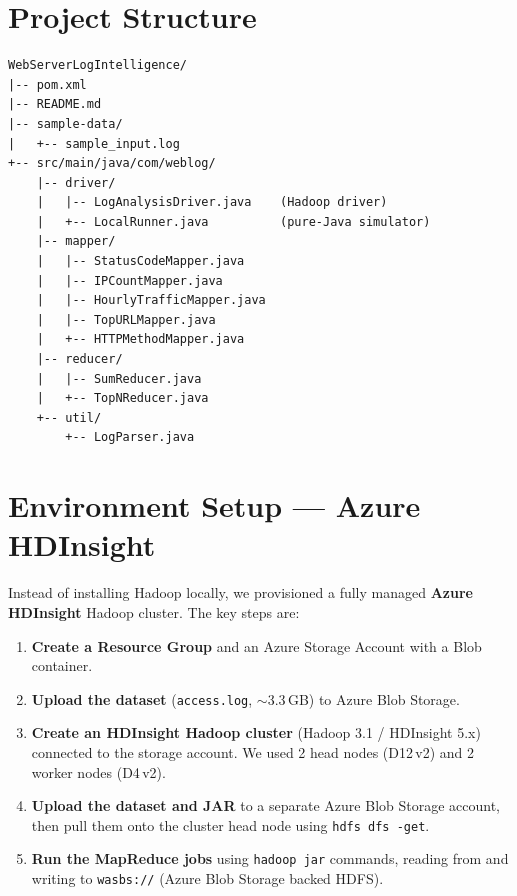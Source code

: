 \documentclass[12pt,a4paper]{article}
\begin{document}
\newpage

\section{Project Structure}

\begin{lstlisting}[language={},caption={Directory layout}]
WebServerLogIntelligence/
|-- pom.xml
|-- README.md
|-- sample-data/
|   +-- sample_input.log
+-- src/main/java/com/weblog/
    |-- driver/
    |   |-- LogAnalysisDriver.java    (Hadoop driver)
    |   +-- LocalRunner.java          (pure-Java simulator)
    |-- mapper/
    |   |-- StatusCodeMapper.java
    |   |-- IPCountMapper.java
    |   |-- HourlyTrafficMapper.java
    |   |-- TopURLMapper.java
    |   +-- HTTPMethodMapper.java
    |-- reducer/
    |   |-- SumReducer.java
    |   +-- TopNReducer.java
    +-- util/
        +-- LogParser.java
\end{lstlisting}

\section{Environment Setup --- Azure HDInsight}

Instead of installing Hadoop locally, we provisioned a fully managed \textbf{Azure HDInsight} Hadoop cluster. The key steps are:

\begin{enumerate}
    \item \textbf{Create a Resource Group} and an Azure Storage Account with a Blob container.
    \item \textbf{Upload the dataset} (\texttt{access.log}, $\sim$3.3\,GB) to Azure Blob Storage.
    \item \textbf{Create an HDInsight Hadoop cluster} (Hadoop 3.1 / HDInsight 5.x) connected to the storage account. We used 2 head nodes (D12\,v2) and 2 worker nodes (D4\,v2).
    \item \textbf{Upload the dataset and JAR} to a separate Azure Blob Storage account, then pull them onto the cluster head node using \texttt{hdfs dfs -get}.
    \item \textbf{Run the MapReduce jobs} using \texttt{hadoop jar} commands, reading from and writing to \texttt{wasbs://} (Azure Blob Storage backed HDFS).
\end{enumerate}
\end{document}
